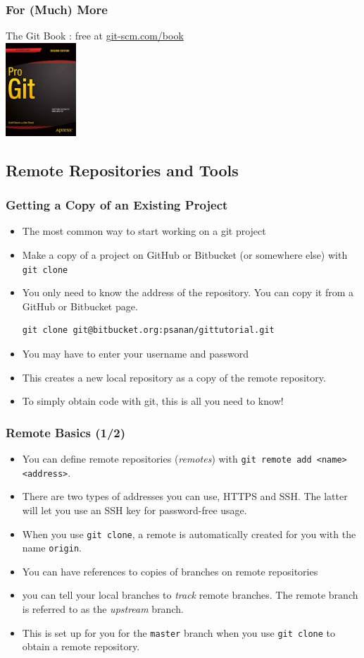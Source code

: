 \documentclass{beamer}
\begin{document}
\begin{frame}[fragile]
\frametitle{For (Much) More}
The Git Book : free at \href{https://git-scm.com/book}{git-scm.com/book} \\
\includegraphics[width=100px]{progit2}
\end{frame}

\subsection{Remote Repositories and Tools}

\begin{frame}[fragile]
\frametitle{Getting a Copy of an Existing Project}
\begin{itemize}
\item
The most common way to start working on a git project 
\item Make a copy of a project on GitHub or Bitbucket (or somewhere else) with \lstinline{git clone}
\item You only need to know the address of the repository. You can copy it from a GitHub or Bitbucket page.
\begin{lstlisting}
git clone git@bitbucket.org:psanan/gittutorial.git
\end{lstlisting}
\item You may have to enter your username and password
\item This creates a new local repository as a copy of the remote repository.
\item To simply obtain code with git, this is all you need to know!
\end{itemize}
\end{frame}

\begin{frame}[fragile]
\frametitle{Remote Basics (1/2)}
\begin{itemize}
\item
You can define remote repositories (\emph{remotes}) with \lstinline{git remote add <name> <address>}.
\item There are two types of addresses you can use, HTTPS and SSH. The latter will let you use an SSH key for password-free usage.
\item When you use \lstinline{git clone}, a remote is automatically created for you with the name \texttt{origin}.
\item You can have references to copies of branches on remote repositories
\item you can tell your local branches to \emph{track} remote branches. The remote branch is referred to as the \emph{upstream} branch.
\item This is set up for you for the \lstinline{master} branch when you use \lstinline{git clone} to obtain a remote repository.
\end{itemize}
\end{frame}
\end{document}
